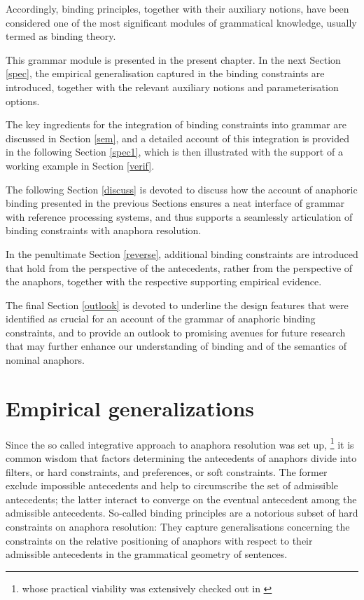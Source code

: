 \documentclass[output=paper
,modfonts
,nonflat]{langsci/langscibook}
\begin{document}
Accordingly, binding principles, together with their auxiliary notions,
 have been considered one of
the most significant modules of grammatical knowledge, usually termed as binding theory.

This grammar module is presented in the present chapter. In the next Section \ref{spec},
the empirical generalisation captured in the binding constraints are introduced, together
with the relevant auxiliary notions and parameterisation options.

The key ingredients for the integration of binding constraints into grammar
are discussed in Section \ref{sem}, and a detailed account of this integration is provided
in the following Section \ref{spec1}, which is then illustrated with the support of
a working example in Section \ref{verif}.

The following Section \ref{discuss} is devoted to discuss how
the account of anaphoric binding presented in the previous Sections ensures a neat interface of grammar with reference processing
systems, and thus supports a seamlessly articulation of binding constraints
with anaphora resolution.

In the penultimate Section \ref{reverse}, additional binding constraints are introduced
that hold from the perspective of the antecedents, rather from the perspective of the anaphors,
together with the respective supporting empirical evidence.

The final Section \ref{outlook} is devoted to underline the design features
that were identified as crucial for an account of the grammar of anaphoric
binding constraints, and to provide an outlook to promising avenues for future
research that may further enhance our understanding of binding and of the semantics
of nominal anaphors.


\section{Empirical generalizations \label{spec}}



Since the so called integrative approach to anaphora resolution was set up,%
\footnote{
\citep{carb:resol88, richluper:resol88, asher:resol89} whose practical viability
was extensively checked out in \citep{lappin:pron94, mitkov:resol97}
}
it is common wisdom that factors determining the antecedents of anaphors divide into 
filters, or hard constraints, and preferences, or soft constraints.  The former exclude
impossible antecedents and help to circumscribe the set of admissible antecedents; 
the latter interact to converge on the eventual antecedent among the admissible antecedents.  
So-called binding principles are a notorious subset of hard constraints on anaphora resolution:  
They capture generalisations concerning the constraints on the relative positioning of anaphors 
with respect to their admissible antecedents in the grammatical geometry of sentences.  
\end{document}
